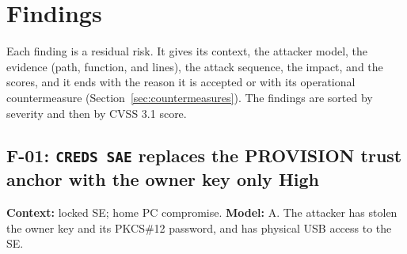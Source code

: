 \documentclass[11pt,a4paper]{article}
\newcommand{\sev}[1]{\textbf{#1}}
\begin{document}
\section{Findings}\label{sec:findings}
Each finding is a residual risk. It gives its context, the attacker model, the evidence (path, function, and lines), the attack sequence, the impact, and the scores, and it ends with the reason it is accepted or with its operational countermeasure (Section~\ref{sec:countermeasures}). The findings are sorted by severity and then by CVSS 3.1 score.

\subsection*{F-01: \texttt{CREDS SAE} replaces the PROVISION trust anchor with the owner key only \hfill \sev{High}}\label{f:F-01}
\textbf{Context:} locked SE; home PC compromise. \textbf{Model:} A. The attacker has stolen the owner key and its PKCS\#12 password, and has physical USB access to the SE.
\end{document}

